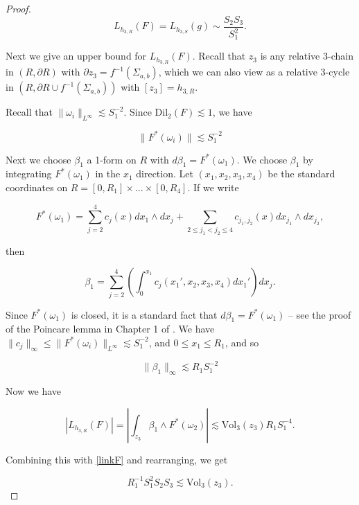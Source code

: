 \documentclass{amsart}
\newtheorem*{theorem 1}{Theorem 1}
\newtheorem*{theorem 2}{Theorem 2}
\newtheorem*{theorem 3}{Theorem 3}
\numberwithin{equation}{section}
\newcommand{\Dil}{\textrm{Dil}}
\newcommand{\Vol}{\textrm{Vol}}
\begin{document}
\begin{proof}
\begin{equation} \label{linkF} L_{h_{3,R}}(F) = L_{h_{3,S}}(g) \sim \frac{ S_2 S_3}{S_1^2}.  \end{equation}

Next we give an upper bound for $L_{h_{3,R}}(F)$.   Recall that $z_3$ is any relative 3-chain in $(R,  \partial R)$ with $\partial z_3 = f^{-1}(\Sigma_{a,b})$,  which we can also view as a relative  3-cycle in $(R,   \partial R \cup f^{-1}(\Sigma_{a,b}))$ with $[z_3] = h_{3, R}$.   

Recall that $\| \omega_i \|_{L^\infty} \lesssim S_1^{-2}$.   Since $\Dil_2(F) \lesssim 1$,  we have

\begin{equation}
\| F^* (\omega_i) \| \lesssim S_1^{-2}
\end{equation}

Next we choose $\beta_1$ a 1-form on $R$ with $d \beta_1 = F^*(\omega_1)$.    We choose $\beta_1$ by integrating $F^*(\omega_1)$ in the $x_1$ direction.   Let $(x_1, x_2, x_3, x_4)$ be the standard coordinates on $R = [0,R_1] \times ... \times [0, R_4]$.   If we write 

$$F^*(\omega_1) = \sum_{j =2}^4 c_j(x) dx_1 \wedge dx_j + \sum_{2 \le j_1 < j_2 \le 4} c_{j_1, j_2}(x) d x_{j_1} \wedge d x_{j_2}, $$

then

$$ \beta_1 = \sum_{j=2}^4 \left( \int_{0}^{x_1} c_j(x_1',  x_2,  x_3, x_4) dx_1' \right) dx_j. $$

Since $F^*(\omega_1)$ is closed,  it is a standard fact that $d \beta_1 = F^*(\omega_1)$ -- see the proof of the Poincare lemma in Chapter 1 of \cite{BT}.    We have $\| c_j \|_\infty \le \|F^*(\omega_i) \|_{L^\infty} \lesssim S_1^{-2}$,  and $0 \le x_1 \le R_1$,  and so

\begin{equation} \label{betabound}
\| \beta_1 \|_{\infty} \lesssim R_1 S_1^{-2}
\end{equation}

Now we have

$$ |L_{h_{3,R}}(F)| = \left| \int_{z_3} \beta_1 \wedge F^*(\omega_2) \right| \lesssim \Vol_3(z_3) R_1 S_1^{-4}.  $$

Combining this with \eqref{linkF} and rearranging, we get

\begin{equation} \label{stepSz}  R_1^{-1} S_1^2 S_2 S_3 \lesssim \Vol_3(z_3).  \end{equation}


\end{proof}
\end{document}
